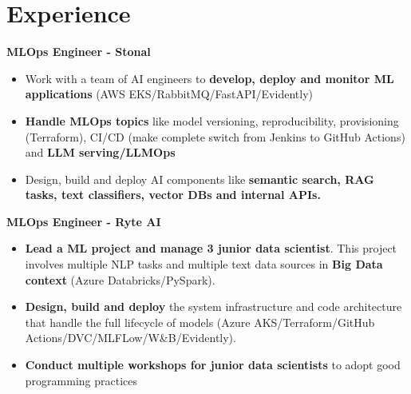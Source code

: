 \documentclass[a4paper,10pt]{article}
\begin{document}
\begin{adjustbox}{valign=t}
    \begin{minipage}{0.6\textwidth}
        \vspace{.5cm}
        \section*{Experience}
        \vspace{-.3cm}
        \begin{description}
            \raggedright
            \item[\normalfont \textcolor{ColorOne}{Since Jan. 2024}]
                \textbf{MLOps Engineer - Stonal}\\
                \small
                \begin{itemize}[topsep=0pt]
                    \item Work with a team of AI engineers to \textbf{develop, deploy and monitor ML applications} (AWS EKS/RabbitMQ/FastAPI/Evidently)
                    \item \textbf{Handle MLOps topics} like model versioning, reproducibility, provisioning (Terraform), CI/CD (make complete switch from Jenkins to GitHub Actions) and \textbf{LLM serving/LLMOps}
                    \item Design, build and deploy AI components like \textbf{semantic search, RAG tasks, text classifiers, vector DBs and internal APIs.}
                \end{itemize}
                \normalsize
            \item[\normalfont \textcolor{ColorOne}{Oct. 2023 -- Jan. 2024}]
                \textbf{MLOps Engineer - Ryte AI}\\
                \small
                \begin{itemize}[topsep=0pt]
                    \item \textbf{Lead a ML project and manage 3 junior data scientist}. This project involves multiple NLP tasks and multiple text data sources in \textbf{Big Data context} (Azure Databricks/PySpark).
                    \item \textbf{Design, build and deploy} the system infrastructure and code architecture that handle the full lifecycle of models (Azure AKS/Terraform/GitHub Actions/DVC/MLFLow/W\&B/Evidently).
                    \item \textbf{Conduct multiple workshops for junior data scientists} to adopt good programming practices
                \end{itemize}

\end{description}
\end{minipage}
\end{adjustbox}
\end{document}
